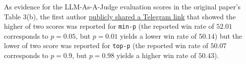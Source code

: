 As evidence for the LLM-As-A-Judge evaluation scores in the original paper's Table 3(b), the first author \href{https://t.me/senior_augur/76}{publicly shared a Telegram link} that showed the higher of two scores was reported for \texttt{min-p} (the reported win rate of $52.01$ corresponds to $p=0.05$, but $p=0.01$ yields a lower win rate of $50.14$) but the lower of two score was reported for \texttt{top-p} (the reported win rate of $50.07$ corresponds to $p=0.9$, but $p=0.98$ yields a higher win rate of $50.43$).
%

